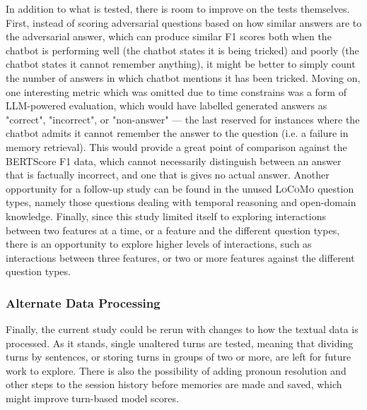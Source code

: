 In addition to what is tested, there is room to improve on the tests themselves. First, instead of scoring adversarial questions based on how similar answers are to the adversarial answer, which can produce similar F1 scores both when the chatbot is performing well (the chatbot states it is being tricked) and poorly (the chatbot states it cannot remember anything), it might be better to simply count the number of answers in which chatbot mentions it has been tricked. Moving on, one interesting metric which was omitted due to time constrains was a form of LLM-powered evaluation, which would have labelled generated answers as "correct", "incorrect", or "non-answer" — the last reserved for instances where the chatbot admits it cannot remember the answer to the question (i.e. a failure in memory retrieval). This would provide a great point of comparison against the BERTScore F1 data, which cannot necessarily distinguish between an answer that is factually incorrect, and one that is gives no actual answer. Another opportunity for a follow-up study can be found in the unused \textsc{LoCoMo} question types, namely those questions dealing with temporal reasoning and open-domain knowledge. Finally, since this study limited itself to exploring interactions between two features at a time, or a feature and the different question types, there is an opportunity to explore higher levels of interactions, such as interactions between three features, or two or more features against the different question types.
	
	
\subsubsection{Alternate Data Processing}

Finally, the current study could be rerun with changes to how the textual data is processed. As it stands, single unaltered turns are tested, meaning that dividing turns by sentences, or storing turns in groups of two or more, are left for future work to explore. There is also the possibility of adding pronoun resolution and other steps to the session history before memories are made and saved, which might improve turn-based model scores.

















